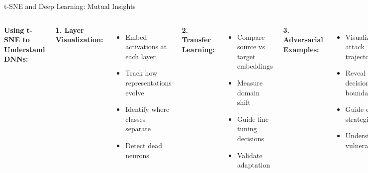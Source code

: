 \documentclass[aspectratio=169]{beamer}
\begin{document}
\begin{frame}{t-SNE and Deep Learning: Mutual Insights}
\begin{columns}
\textbf{Using t-SNE to Understand DNNs:}

\textbf{1. Layer Visualization:}
\begin{itemize}
\item Embed activations at each layer
\item Track how representations evolve
\item Identify where classes separate
\item Detect dead neurons
\end{itemize}

\textbf{2. Transfer Learning:}
\begin{itemize}
\item Compare source vs target embeddings
\item Measure domain shift
\item Guide fine-tuning decisions
\item Validate adaptation
\end{itemize}

\textbf{3. Adversarial Examples:}
\begin{itemize}
\item Visualize attack trajectories
\item Reveal decision boundaries
\item Guide defense strategies
\item Understand vulnerabilities
\end{itemize}

\textbf{4. Architecture Search:}
\begin{itemize}
\item Compare different architectures
\item Embedding quality as metric
\item Guide design choices
\end{itemize}

\textbf{Using Deep Learning for t-SNE:}

\textbf{Parametric t-SNE (Neural Network):}

Architecture: $x \in \mathbb{R}^D \xrightarrow{NN} y \in \mathbb{R}^2$
  
  Train network $f_\theta$ to minimize:
  $\mathcal{L} = \sum_{i,j} p_{ij}\log\frac{p_{ij}}{q_{ij}(f_\theta(x_i), f_\theta(x_j))}$
  

\end{columns}
\end{frame}
\end{document}
